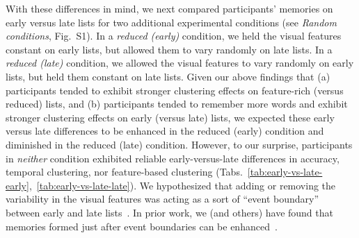 \documentclass[11pt]{article}
\newcommand{\dynamicsRandom}{S1}
\newcommand{\abbreviations}{S1}
\begin{document}
With these differences in mind, we next compared participants' memories on
early versus late lists for two additional experimental conditions (see
\textit{Random conditions}, Fig.~\dynamicsRandom). In a \textit{reduced
(early)} condition, we held the visual features constant on early lists, but
allowed them to vary randomly on late lists. In a \textit{reduced (late)}
condition, we allowed the visual features to vary randomly on early lists, but
held them constant on late lists. Given our above findings that (a)
participants tended to exhibit stronger clustering effects on feature-rich
(versus reduced) lists, and (b) participants tended to remember more words and
exhibit stronger clustering effects on early (versus late) lists, we expected
these early versus late differences to be enhanced in the reduced (early)
condition and diminished in the reduced (late) condition. However, to our
surprise, participants in \textit{neither} condition exhibited reliable
early-versus-late differences in accuracy, temporal clustering, nor
feature-based clustering
(Tabs.~\ref{tab:early-vs-late-early},~\ref{tab:early-vs-late-late}). We
hypothesized that adding or removing the variability in the visual features was
acting as a sort of ``event boundary'' between early and late
lists~\citep[e.g.,][]{ClewEtal19,RadvZack17,RadvCope06}. In prior work, we (and
others) have found that memories formed just after event boundaries can be
enhanced~\citep[e.g., due to less contextual interference between pre- and
post-boundary items;][]{MannEtal16, PettEtal16, GoldEtal17, FlorEtal17}.

\begin{table}[tp]
\centering
\tiny


\caption{\textbf{Comparing memory in the feature-rich versus reduced (early)
conditions (all lists).} The $t$-tests reported in the table were carried out
across-participants, and reflect data aggregated across all lists from each
participant. Abbreviations used in this table are defined in
Table~\abbreviations.}

\label{tab:feature-rich-vs-reduced-early}
\end{table}

\begin{table}[tp]
\centering
\tiny


\caption{\textbf{Comparing memory in the reduced versus reduced (early)
conditions (all lists).} The $t$-tests reported in the table were carried out
across-participants, and reflect data aggregated across all lists from each
participant. Abbreviations used in this table are defined in
Table~\abbreviations.}

\label{tab:reduced-vs-reduced-early}
\end{table}
\end{document}
